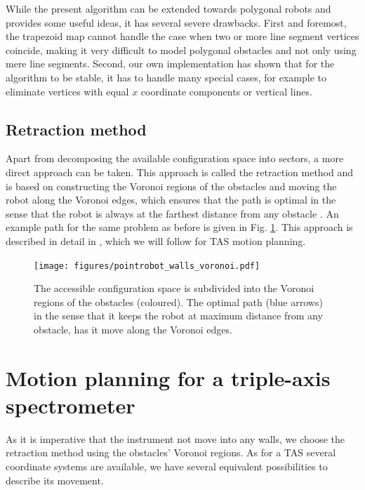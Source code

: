 While the present algorithm can be extended towards polygonal robots \cite[Ch. 13.3, pp. 290-297]{Berg2008} and provides
some useful ideas, it has several severe drawbacks. First and foremost, the trapezoid map cannot handle the case when
two or more line segment vertices coincide, making it very difficult to model polygonal obstacles and not only using mere
line segments. Second, our own implementation has shown that for the algorithm to be stable, it has to handle many 
special cases, for example to eliminate vertices with equal $x$ coordinate components or vertical lines.

\vspace{0.5cm}

\subsection*{Retraction method}
Apart from decomposing the available configuration space into sectors, a more direct approach can be taken. This
approach is called the retraction method and is based on constructing the Voronoi regions 
of the obstacles and moving the robot along the Voronoi edges, which ensures that the path is optimal in the
sense that the robot is always at the farthest distance from any obstacle \cite[pp. 163 and 304]{Berg2008}.
An example path for the same problem as before is given in Fig. \ref{fig:robot_voronoi}.
This approach is described in detail in \cite[pp. 247-251]{FUH_geo2020}, which we will follow for TAS motion planning.

\begin{figure}[htb]
	\centering
	\texttt{[image: figures/pointrobot\_walls\_voronoi.pdf]}
	\caption{The accessible configuration space is subdivided into the Voronoi regions of the obstacles (coloured). The optimal
		path (blue arrows) in the sense that it keeps the robot at maximum distance from any obstacle, has it move along the 
		Voronoi edges.}
	\label{fig:robot_voronoi}
\end{figure}



\section{Motion planning for a triple-axis spectrometer}
\label{sec:tasrobot}

As it is imperative that the instrument not move into any walls, we choose the retraction method using the obstacles' Voronoi regions.
As for a TAS several coordinate systems are available, we have several equivalent possibilities to describe its movement. 

